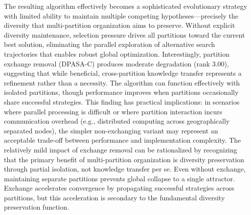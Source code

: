 \documentclass[11pt]{article}
\begin{document}
The resulting algorithm effectively becomes a sophisticated evolutionary strategy with limited ability to maintain multiple competing hypotheses---precisely the diversity that multi-partition organization aims to preserve. Without explicit diversity maintenance, selection pressure drives all partitions toward the current best solution, eliminating the parallel exploration of alternative search trajectories that enables robust global optimization.
Interestingly, partition exchange removal (DPASA-C) produces moderate degradation (rank 3.00), suggesting that while beneficial, cross-partition knowledge transfer represents a refinement rather than a necessity. The algorithm can function effectively with isolated partitions, though performance improves when partitions occasionally share successful strategies. This finding has practical implications: in scenarios where parallel processing is difficult or where partition interaction incurs communication overhead (e.g., distributed computing across geographically separated nodes), the simpler non-exchanging variant may represent an acceptable trade-off between performance and implementation complexity.
The relatively mild impact of exchange removal can be rationalized by recognizing that the primary benefit of multi-partition organization is diversity preservation through partial isolation, not knowledge transfer per se. Even without exchange, maintaining separate partitions prevents global collapse to a single attractor. Exchange accelerates convergence by propagating successful strategies across partitions, but this acceleration is secondary to the fundamental diversity preservation function.
\end{document}
